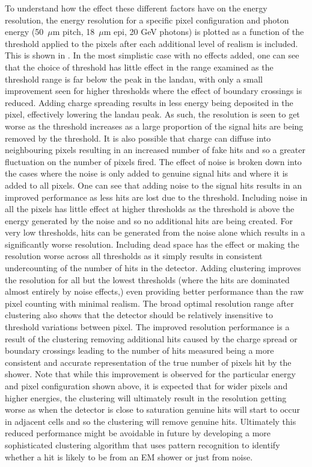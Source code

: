 To understand how the effect these different factors have on the energy resolution, the energy resolution for a specific pixel configuration and photon energy (50~$\mu$m pitch, 18~$\mu$m epi, 20 GeV photons) is plotted as a function of the threshold applied to the pixels after each additional level of realism is included. This is shown in . In the most simplistic case with no effects added, one can see that the choice of threshold has little effect in the range examined as the threshold range is far below the peak in the landau, with only a small improvement seen for higher thresholds where the effect of boundary crossings is reduced. Adding charge spreading results in less energy being deposited in the pixel, effectively lowering the landau peak. As such, the resolution is seen to get worse as the threshold increases as a large proportion of the signal hits are being removed by the threshold. It is also possible that charge can diffuse into neighbouring pixels resulting in an increased number of fake hits and so a greater fluctuation on the number of pixels fired. The effect of noise is broken down into the cases where the noise is only added to genuine signal hits and where it is added to all pixels. One can see that adding noise to the signal hits results in an improved performance as less hits are lost due to the threshold. Including noise in all the pixels has little effect at higher thresholds as the threshold is above the energy generated by the noise and so no additional hits are being created. For very low thresholds, hits can be generated from the noise alone which results in a significantly worse resolution. Including dead space has the effect or making the resolution worse across all thresholds as it simply results in consistent undercounting of the number of hits in the detector. Adding clustering improves the resolution for all but the lowest thresholds (where the hits are dominated almost entirely by noise effects,) even providing better performance than the raw pixel counting with minimal realism. The broad optimal resolution range after clustering also shows that the detector should be relatively insensitive to threshold variations between pixel. The improved resolution performance is a result of the clustering removing additional hits caused by the charge spread or boundary crossings leading to the number of hits measured being a more consistent and accurate representation of the true number of pixels hit by the shower. Note that while this improvement is observed for the particular energy and pixel configuration shown above, it is expected that for wider pixels and higher energies, the clustering will ultimately result in the resolution getting worse as when the detector is close to saturation genuine hits will start to occur in adjacent cells and so the clustering will remove genuine hits. Ultimately this reduced performance might be avoidable in future by developing a more sophisticated clustering algorithm that uses pattern recognition to identify whether a hit is likely to be from an EM shower or just from noise.


